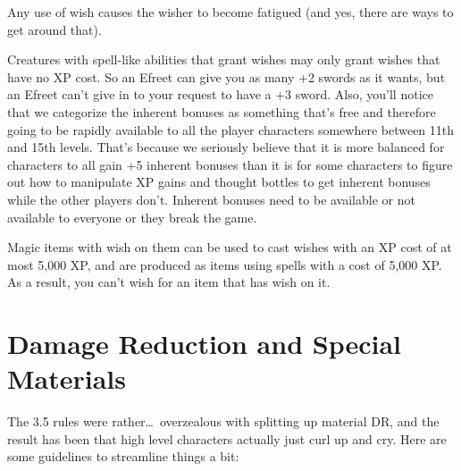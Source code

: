 Any use of wish causes the wisher to become fatigued (and yes, there are ways to get around that).

Creatures with spell-like abilities that grant wishes may only grant wishes that have no XP cost. So an Efreet can give you as many +2 swords as it wants, but an Efreet can't give in to your request to have a +3 sword. Also, you'll notice that we categorize the inherent bonuses as something that's free and therefore going to be rapidly available to all the player characters somewhere between 11th and 15th levels. That's because we seriously believe that it is more balanced for characters to all gain +5 inherent bonuses than it is for some characters to figure out how to manipulate XP gains and thought bottles to get inherent bonuses while the other players don't. Inherent bonuses need to be available or not available to everyone or they break the game.

Magic items with wish on them can be used to cast wishes with an XP cost of at most 5,000 XP, and are produced as items using spells with a cost of 5,000 XP. As a result, you can't wish for an item that has wish on it.

\section{Damage Reduction and Special Materials}

The 3.5 rules were rather\ldots\  overzealous with splitting up material DR, and the result has been that high level characters actually just curl up and cry. Here are some guidelines to streamline things a bit:

